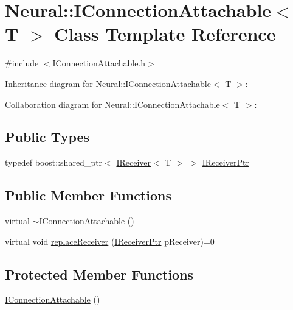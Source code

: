 \hypertarget{class_neural_1_1_i_connection_attachable}{
\section{Neural::IConnectionAttachable$<$ T $>$ Class Template Reference}
\label{class_neural_1_1_i_connection_attachable}
}


{\ttfamily \#include $<$IConnectionAttachable.h$>$}



Inheritance diagram for Neural::IConnectionAttachable$<$ T $>$:


Collaboration diagram for Neural::IConnectionAttachable$<$ T $>$:
\subsection*{Public Types}
\begin{DoxyCompactItemize}
\item 
typedef boost::shared\_\-ptr$<$ \hyperlink{class_neural_1_1_i_receiver}{IReceiver}$<$ T $>$ $>$ \hyperlink{class_neural_1_1_i_connection_attachable_a6b544fcb24d7822a1118276eafbf81ec}{IReceiverPtr}
\end{DoxyCompactItemize}
\subsection*{Public Member Functions}
\begin{DoxyCompactItemize}
\item 
virtual \hyperlink{class_neural_1_1_i_connection_attachable_a86758bf22d9448b3dc88ba3d6d73f862}{$\sim$IConnectionAttachable} ()
\item 
virtual void \hyperlink{class_neural_1_1_i_connection_attachable_a01c888e0e6861f1faed5a871bdf65838}{replaceReceiver} (\hyperlink{class_neural_1_1_i_connection_attachable_a6b544fcb24d7822a1118276eafbf81ec}{IReceiverPtr} pReceiver)=0
\end{DoxyCompactItemize}
\subsection*{Protected Member Functions}
\begin{DoxyCompactItemize}
\item 
\hyperlink{class_neural_1_1_i_connection_attachable_adb171a9e7676e8e55aa5dc06a9279703}{IConnectionAttachable} ()
\end{DoxyCompactItemize}



